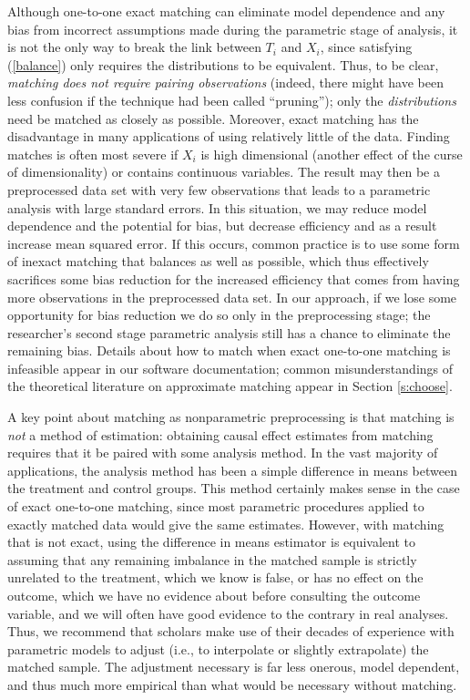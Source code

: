 \documentclass[11pt,titlepage]{article}
\begin{document}
Although one-to-one exact matching can eliminate model dependence and
any bias from incorrect assumptions made during the parametric stage
of analysis, it is not the only way to break the link between $T_i$
and $X_i$, since satisfying (\ref{balance}) only requires the
distributions to be equivalent.  Thus, to be clear, \emph{matching
  does not require pairing observations} (indeed, there might have
been less confusion if the technique had been called ``pruning'');
only the \emph{distributions} need be matched as closely as possible.
Moreover, exact matching has the disadvantage in many applications of
using relatively little of the data.  Finding matches is often most
severe if $X_i$ is high dimensional (another effect of the curse of
dimensionality) or contains continuous variables.  The result may then
be a preprocessed data set with very few observations that leads to a
parametric analysis with large standard errors.  In this situation, we
may reduce model dependence and the potential for bias, but decrease
efficiency and as a result increase mean squared error.  If this
occurs, common practice is to use some form of inexact matching that
balances as well as possible, which thus effectively sacrifices some
bias reduction for the increased efficiency that comes from having
more observations in the preprocessed data set.  In our approach, if
we lose some opportunity for bias reduction we do so only in the
preprocessing stage; the researcher's second stage parametric analysis
still has a chance to eliminate the remaining bias.  Details about how
to match when exact one-to-one matching is infeasible appear in our
software documentation; common misunderstandings of the theoretical
literature on approximate matching appear in Section \ref{s:choose}.

A key point about matching as nonparametric preprocessing is that
matching is \emph{not} a method of estimation: obtaining causal effect
estimates from matching requires that it be paired with some analysis
method.  In the vast majority of applications, the analysis method has
been a simple difference in means between the treatment and control
groups.  This method certainly makes sense in the case of exact
one-to-one matching, since most parametric procedures applied to
exactly matched data would give the same estimates.  However, with
matching that is not exact, using the difference in means estimator is
equivalent to assuming that any remaining imbalance in the matched
sample is strictly unrelated to the treatment, which we know is false,
or has no effect on the outcome, which we have no evidence about
before consulting the outcome variable, and we will often have good
evidence to the contrary in real analyses.  Thus, we recommend that
scholars make use of their decades of experience with parametric
models to adjust (i.e., to interpolate or slightly extrapolate) the
matched sample.  The adjustment necessary is far less onerous, model
dependent, and thus much more empirical than what would be necessary
without matching.
\end{document}
